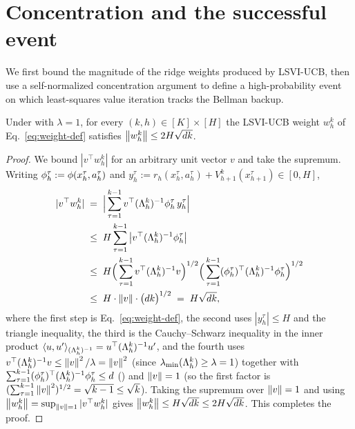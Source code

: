 \section{Concentration and the successful event}\label{sec:concentration}

We first bound the magnitude of the ridge weights produced by LSVI-UCB, then
use a self-normalized concentration argument to define a high-probability event
on which least-squares value iteration tracks the Bellman backup.

\begin{lemma}\label{lem:weight-bound}
Under  with $\lambda=1$, for every $(k,h)\in[K]\times[H]$
the LSVI-UCB weight $w_h^k$ of Eq.~\eqref{eq:weight-def} satisfies
$\left\| w_h^k \right\|\le 2H\sqrt{dk}$.
\end{lemma}

\begin{proof}
We bound $|v^\top w_h^k|$ for an arbitrary unit vector $v$ and take the
supremum. Writing $\phi_h^\tau:=\phi(x_h^\tau,a_h^\tau)$ and
$y_h^\tau:=r_h(x_h^\tau,a_h^\tau)+V_{h+1}^k(x_{h+1}^\tau)\in[0,H]$,
\begin{align*}
|v^\top w_h^k|
&\;=\; \Big| \sum_{\tau=1}^{k-1} v^\top (\Lambda_h^k)^{-1}\phi_h^\tau\, y_h^\tau \Big| \\
&\;\le\; H \sum_{\tau=1}^{k-1} \big| v^\top (\Lambda_h^k)^{-1}\phi_h^\tau \big| \\
&\;\le\; H \Big( \sum_{\tau=1}^{k-1} v^\top (\Lambda_h^k)^{-1} v \Big)^{1/2} \Big( \sum_{\tau=1}^{k-1} (\phi_h^\tau)^\top (\Lambda_h^k)^{-1}\phi_h^\tau \Big)^{1/2} \\
&\;\le\; H \cdot \left\| v \right\| \cdot \big( dk \big)^{1/2}
\;=\; H\sqrt{dk},
\end{align*}
where the first step is Eq.~\eqref{eq:weight-def}, the second uses
$|y_h^\tau|\le H$ and the triangle inequality, the third is the Cauchy--Schwarz
inequality in the inner product $\langle u,u'\rangle_{(\Lambda_h^k)^{-1}}=u^\top
(\Lambda_h^k)^{-1}u'$, and the fourth uses $v^\top(\Lambda_h^k)^{-1}v\le
\left\| v \right\|^2/\lambda=\left\| v \right\|^2$ (since $\lambda_{\min}(\Lambda_h^k)\ge\lambda=1$)
together with $\sum_{\tau=1}^{k-1}(\phi_h^\tau)^\top(\Lambda_h^k)^{-1}
\phi_h^\tau\le d$ () and $\left\| v \right\|=1$ (so the first
factor is $(\sum_{\tau=1}^{k-1}\left\| v \right\|^2)^{1/2}=\sqrt{k-1}\le\sqrt k$). Taking the
supremum over $\left\| v \right\|=1$ and using $\left\| w_h^k \right\|=\sup_{\left\| v \right\|=1}|v^\top
w_h^k|$ gives $\left\| w_h^k \right\|\le H\sqrt{dk}\le 2H\sqrt{dk}$. This completes the
proof.
\end{proof}


